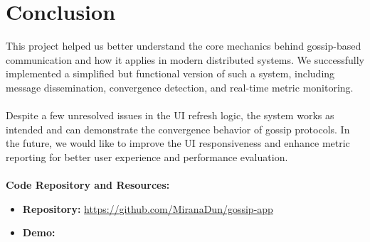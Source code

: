 \documentclass[a4paper,12pt]{article}
\begin{document}
\section{Conclusion}

This project helped us better understand the core mechanics behind gossip-based communication and how it applies in modern distributed systems. We successfully implemented a simplified but functional version of such a system, including message dissemination, convergence detection, and real-time metric monitoring.\\\\
Despite a few unresolved issues in the UI refresh logic, the system works as intended and can demonstrate the convergence behavior of gossip protocols. In the future, we would like to improve the UI responsiveness and enhance metric reporting for better user experience and performance evaluation.\\\\
\textbf{Code Repository and Resources:}
\begin{itemize}
    \item \textbf{Repository:} \url{https://github.com/MiranaDun/gossip-app}
    \item \textbf{Demo:} \url{}
\end{itemize}
\end{document}

